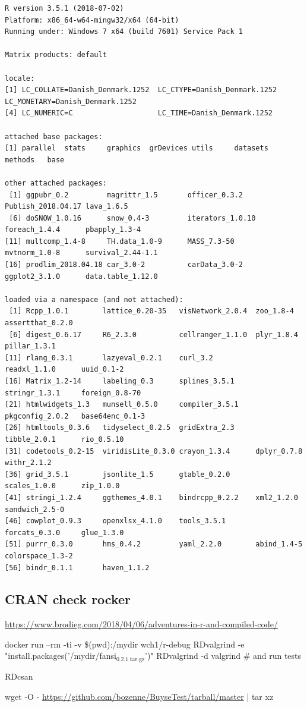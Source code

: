 \documentclass{article}
\begin{document}
\begin{verbatim}
R version 3.5.1 (2018-07-02)
Platform: x86_64-w64-mingw32/x64 (64-bit)
Running under: Windows 7 x64 (build 7601) Service Pack 1

Matrix products: default

locale:
[1] LC_COLLATE=Danish_Denmark.1252  LC_CTYPE=Danish_Denmark.1252    LC_MONETARY=Danish_Denmark.1252
[4] LC_NUMERIC=C                    LC_TIME=Danish_Denmark.1252    

attached base packages:
[1] parallel  stats     graphics  grDevices utils     datasets  methods   base     

other attached packages:
 [1] ggpubr_0.2         magrittr_1.5       officer_0.3.2      Publish_2018.04.17 lava_1.6.5        
 [6] doSNOW_1.0.16      snow_0.4-3         iterators_1.0.10   foreach_1.4.4      pbapply_1.3-4     
[11] multcomp_1.4-8     TH.data_1.0-9      MASS_7.3-50        mvtnorm_1.0-8      survival_2.44-1.1 
[16] prodlim_2018.04.18 car_3.0-2          carData_3.0-2      ggplot2_3.1.0      data.table_1.12.0 

loaded via a namespace (and not attached):
 [1] Rcpp_1.0.1        lattice_0.20-35   visNetwork_2.0.4  zoo_1.8-4         assertthat_0.2.0 
 [6] digest_0.6.17     R6_2.3.0          cellranger_1.1.0  plyr_1.8.4        pillar_1.3.1     
[11] rlang_0.3.1       lazyeval_0.2.1    curl_3.2          readxl_1.1.0      uuid_0.1-2       
[16] Matrix_1.2-14     labeling_0.3      splines_3.5.1     stringr_1.3.1     foreign_0.8-70   
[21] htmlwidgets_1.3   munsell_0.5.0     compiler_3.5.1    pkgconfig_2.0.2   base64enc_0.1-3  
[26] htmltools_0.3.6   tidyselect_0.2.5  gridExtra_2.3     tibble_2.0.1      rio_0.5.10       
[31] codetools_0.2-15  viridisLite_0.3.0 crayon_1.3.4      dplyr_0.7.8       withr_2.1.2      
[36] grid_3.5.1        jsonlite_1.5      gtable_0.2.0      scales_1.0.0      zip_1.0.0        
[41] stringi_1.2.4     ggthemes_4.0.1    bindrcpp_0.2.2    xml2_1.2.0        sandwich_2.5-0   
[46] cowplot_0.9.3     openxlsx_4.1.0    tools_3.5.1       forcats_0.3.0     glue_1.3.0       
[51] purrr_0.3.0       hms_0.4.2         yaml_2.2.0        abind_1.4-5       colorspace_1.3-2 
[56] bindr_0.1.1       haven_1.1.2
\end{verbatim}

\subsection{CRAN check rocker}
\label{sec:org73b0c1e}
\url{https://www.brodieg.com/2018/04/06/adventures-in-r-and-compiled-code/}

docker run --rm -ti -v \$(pwd):/mydir wch1/r-debug
RDvalgrind -e "install.packages('/mydir/fansi\(_{\text{0.2.1.tar.gz}}\)')"
RDvalgrind -d valgrind  \# and run tests

RDcsan

wget -O - \url{https://github.com/bozenne/BuyseTest/tarball/master} | tar xz
\end{document}
